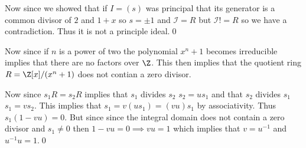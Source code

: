 \documentclass[12pt]{amsart}
\begin{document}
\begin{problem}
\begin{subproblem}
      Now since we showed that if $I=(s)$ was principal that its generator is a common divisor of $2$ and $1+x$ so $s=\pm1$ and $\mathcal{I}=R$ but $\mathcal{I}!=R$ so we have a contradiction. Thus it is not a principle ideal.\qed
    \end{subproblem}
    \begin{subproblem}
      Now since if $n$ is a power of two the polynomial $x^n+1$ becomes irreducible implies that there are no factors over $\Z$. This then implies that the quotient ring $R = \Z[x]/(x^n+1)$ does not contian a zero divisor. 

      Now since $s_1R = s_2R$ implies that $s_1$ divides $s_2 $ $s_2 = us_1$ and that $s_2$ divides $s_1$ $s_1 = vs_2$. This implies that $s_1 = v(us_1) = (vu)s_1$ by associativity. Thus $s_1(1-vu)=0$. But since since the integral domain does not contain a zero divisor and $s_1\neq 0$ then $1-vu=0\implies vu =1$ which implies that $v=u^{-1}$ and $u^{-1}u=1$.\qed
    \end{subproblem}
  \end{problem}
\end{document}

